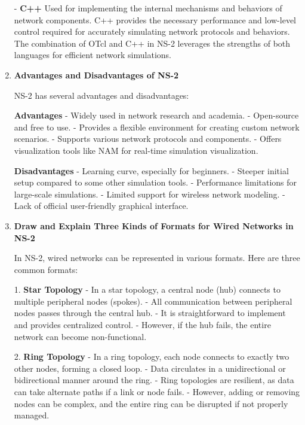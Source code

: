 \documentclass[11pt]{article}
\begin{document}
\begin{enumerate}
          - \textbf{C++} Used for implementing the internal mechanisms and behaviors of network components. C++ provides the necessary performance and low-level control required for accurately simulating network protocols and behaviors. The combination of OTcl and C++ in NS-2 leverages the strengths of both languages for efficient network simulations.

    \item \textbf{Advantages and Disadvantages of NS-2}

          NS-2 has several advantages and disadvantages:

          \textbf{Advantages}
          - Widely used in network research and academia.
          - Open-source and free to use.
          - Provides a flexible environment for creating custom network scenarios.
          - Supports various network protocols and components.
          - Offers visualization tools like NAM for real-time simulation visualization.

          \textbf{Disadvantages}
          - Learning curve, especially for beginners.
          - Steeper initial setup compared to some other simulation tools.
          - Performance limitations for large-scale simulations.
          - Limited support for wireless network modeling.
          - Lack of official user-friendly graphical interface.

    \item \textbf{Draw and Explain Three Kinds of Formats for Wired Networks in NS-2}

          In NS-2, wired networks can be represented in various formats. Here are three common formats:

          1. \textbf{Star Topology}
          - In a star topology, a central node (hub) connects to multiple peripheral nodes (spokes).
          - All communication between peripheral nodes passes through the central hub.
          - It is straightforward to implement and provides centralized control.
          - However, if the hub fails, the entire network can become non-functional.

          2. \textbf{Ring Topology}
          - In a ring topology, each node connects to exactly two other nodes, forming a closed loop.
          - Data circulates in a unidirectional or bidirectional manner around the ring.
          - Ring topologies are resilient, as data can take alternate paths if a link or node fails.
          - However, adding or removing nodes can be complex, and the entire ring can be disrupted if not properly managed.


\end{enumerate}
\end{document}
